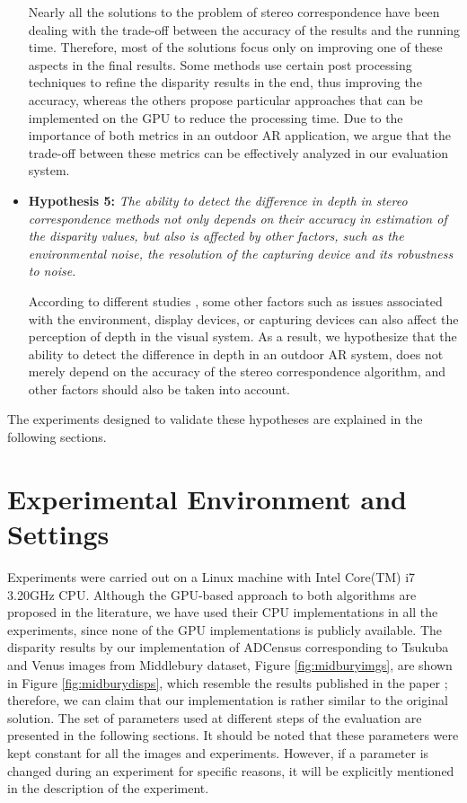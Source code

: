 \begin{itemize}
Nearly all the solutions to the problem of stereo correspondence have been dealing with the trade-off between the accuracy of the results and the running time.
Therefore, most of the solutions focus only on improving one of these aspects in the final results. Some methods use certain post processing techniques to refine the 
disparity results in the end, thus improving the accuracy, whereas the others propose particular approaches that can be implemented on the GPU to reduce the processing time.
Due to the importance of both metrics in an outdoor AR application, we argue that the trade-off between these metrics can be effectively analyzed in our evaluation system.

\item \textbf{Hypothesis 5:} \emph{The ability to detect the difference in depth in stereo correspondence methods not only depends on their accuracy
in estimation of the disparity values, but also is affected by other factors, such as the environmental noise, the resolution of the capturing device and its
robustness to noise.}

According to different studies \cite{dras96, kru10,azuma01}, some other factors such as issues associated with the environment, display devices, or capturing devices
can also affect the perception of depth in the visual system. As a result, we hypothesize that the ability to detect the difference in depth in an outdoor AR system,
does not merely depend on the accuracy of the stereo correspondence algorithm, and other factors should also be taken into account.
\end{itemize}
\noindent
The experiments designed to validate these hypotheses are explained in the following sections.

\section{Experimental Environment and Settings}
Experiments were carried out on a Linux machine with Intel Core(TM) i7 3.20GHz CPU. 
Although the GPU-based approach to both algorithms are proposed in the literature,
we have used their CPU implementations in all the experiments, since none of the GPU implementations is publicly available.
The disparity results by our implementation of ADCensus corresponding to Tsukuba and Venus images from Middlebury dataset, Figure \ref{fig:midburyimgs}, 
are shown in Figure \ref{fig:midburydisps}, which resemble the results published in the paper \cite{mei11}; therefore, we can
claim that our implementation is rather similar to the original solution. \newline
The set of parameters used at different steps of the evaluation are presented in the following sections.
It should be noted that these parameters were kept constant for all the images and experiments. However, if a parameter is changed during an experiment for specific
reasons, it will be explicitly mentioned in the description of the experiment.

